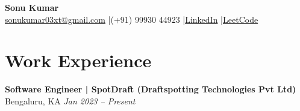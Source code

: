 \documentclass[a4paper,10pt]{article}
\begin{document}
\begin{center}
    {\Huge \textbf{Sonu Kumar}}\\[6pt]
    \href{mailto:sonukumar03xt@gmail.com}{sonukumar03xt@gmail.com}
    \quad|\quad (+91) 99930 44923
    \quad|\quad \href{https://www.linkedin.com/in/sonukumar03xt}{LinkedIn}
    \quad|\quad \href{https://leetcode.com/sonukumar03xt}{LeetCode}
\end{center}

\vspace{0.5em}

\section{Work Experience}

\textbf{Software Engineer | SpotDraft (Draftspotting Technologies Pvt Ltd)} \hfill Bengaluru, KA \quad \textit{Jan 2023 – Present}
\end{document}
